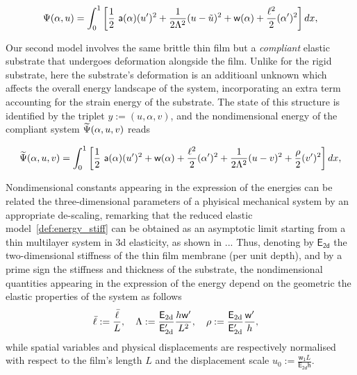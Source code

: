 \begin{equation}
    \label{def:energy_stiff}
    \Psi(\alpha, u) = \int_{0}^{1} \left[ \frac{1}{2} \ \soften(\alpha)(u')^2 
    + \frac{1}{2 \elastell^2} (u-\subsu)^2
    + \homogdiss(\alpha) + \frac{\damagell^2}{2}(\alpha')^2 
     \right] dx,
\end{equation}

Our second model involves the same brittle thin film but a \emph{compliant} elastic substrate that undergoes deformation alongside the film. Unlike for the rigid substrate, here the substrate's deformation is an additioanl unknown which affects the overall energy landscape of the system, incorporating an extra term accounting for the strain energy of the substrate. 
The state of this structure is identified by the triplet $y:=(u, \alpha, v)$, and the nondimensional energy of the compliant system  $\widetilde\Psi(\alpha, u, v)$ reads

\begin{equation}
    \label{def:energy_compliant}
    \Ecompl(\alpha, u,  v) = \int_{0}^1 \left[ \frac{1}{2} \ \soften(\alpha)(u')^2 + \homogdiss(\alpha) + \frac{\damagell^2}{2}(\alpha')^2 
    + \frac{1}{2 \elastell^2} (u- v)^2 
    + \frac{\stiffratio}{2}  (v')^2 \right] dx,
\end{equation}



Nondimensional constants appearing in the expression of the energies can be related the three-dimensional parameters of a phyisical mechanical system by an appropriate de-scaling, remarking that the reduced elastic model~\eqref{def:energy_stiff} can be obtained as an asymptotic limit starting from a thin multilayer system in 3d elasticity, as shown in ...
Thus, denoting by $\mathsf{E_\text{2d}}$ the two-dimensional stiffness of the thin film membrane (per unit depth), and by a prime sign the stiffness and thickness of the substrate, the nondimensional quantities appearing in the expression of the energy depend on the geometric the elastic properties of the system as follows
\begin{equation}
    \label{def:dimensional_parameters}
    \bar{\ell} := \frac{\bar{\ell}}{L}, \quad
    \Lambda := \frac{\mathsf{E_{\text{2d}}}}{\mathsf{E'_{\text{2d}}}}\frac{h \mathsf{w}'}{L^2}, \quad
    \rho := \frac{\mathsf{E_{\text{2d}}}}{\mathsf{E'_{\text{2d}}}}\frac{\mathsf{w}'}{h}, \quad
\end{equation}
while spatial variables and physical displacements are respectively normalised with respect to the film's length $L$ and the displacement scale $u_0 := \frac{\mathsf{w_1}L}{\mathsf{E_{\text{2d}} h}}$.




